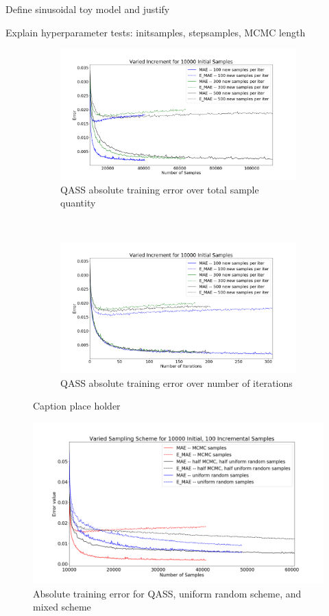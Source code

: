 Define sinusoidal toy model and justify

Explain hyperparameter tests: initsamples, stepsamples, MCMC length

\begin{figure}[h]
    \centering
    \begin{subfigure}[t]{0.5\textwidth}
        \centering
        \includegraphics[width=1.1\linewidth]{fig5_qassincrsamp.png}
        \caption{QASS absolute training error over total sample quantity}
    \end{subfigure}%
    ~ 
    \begin{subfigure}[t]{0.5\textwidth}
        \centering
        \includegraphics[width=1.1\linewidth]{fig6_qassincrtime.png}
        \caption{QASS absolute training error over number of iterations}
    \end{subfigure}
    \caption{Caption place holder}
\end{figure}

\begin{figure}[h]
  \centering
    \includegraphics[width=0.8\linewidth]{fig7_qasssampling.png}
    \caption{Absolute training error for QASS, uniform random scheme, and mixed scheme}
  \label{fig:pca}
\end{figure}
